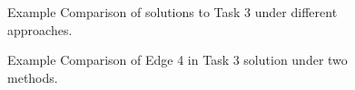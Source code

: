 \documentclass{llncs}
\begin{document}
\begin{figure}[h]
\centerline{
}
 \caption{Example Comparison of solutions to Task 3 under different approaches.}
 \label{comparison}
\end{figure}
\vspace{0.3cm}
\begin{figure}
\centerline{
}
 \caption{Example Comparison of Edge 4 in Task 3 solution under two methods.}
 \label{comparison}
\end{figure}
\end{document}
